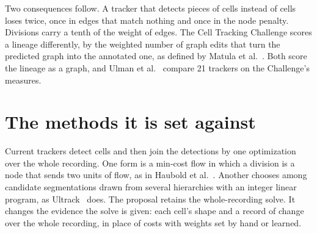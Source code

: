 Two consequences follow. A tracker that detects pieces of cells instead of cells loses twice, once in edges that match nothing and once in the node penalty. Divisions carry a tenth of the weight of edges. The Cell Tracking Challenge scores a lineage differently, by the weighted number of graph edits that turn the predicted graph into the annotated one, as defined by Matula et al.~\cite{src:Matula-2015}. Both score the lineage as a graph, and Ulman et al.~\cite{src:Ulman-2017} compare 21 trackers on the Challenge's measures.

\section{\texorpdfstring{The methods it is set against}{The methods it is set against}}

Current trackers detect cells and then join the detections by one optimization over the whole recording. One form is a min-cost flow in which a division is a node that sends two units of flow, as in Haubold et al.~\cite{src:Haubold-2016}. Another chooses among candidate segmentations drawn from several hierarchies with an integer linear program, as Ultrack~\cite{src:Ultrack} does. The proposal retains the whole-recording solve. It changes the evidence the solve is given: each cell's shape and a record of change over the whole recording, in place of costs with weights set by hand or learned.
